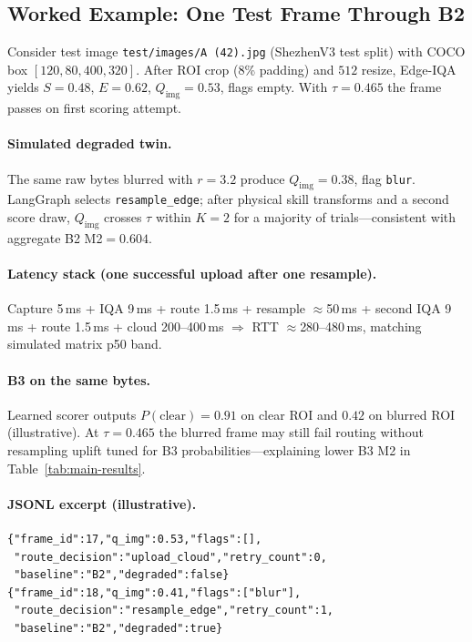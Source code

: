 \subsection{Worked Example: One Test Frame Through B2}
\label{sec:walkthrough}

Consider test image \texttt{test/images/A (42).jpg} (ShezhenV3 test split) with COCO box $[120, 80, 400, 320]$.
After ROI crop (8\% padding) and $512$ resize, Edge-IQA yields $S{=}0.48$, $E{=}0.62$, $Q_{\mathrm{img}}{=}0.53$, flags empty.
With $\tau{=}0.465$ the frame passes on first scoring attempt.

\paragraph{Simulated degraded twin.}
The same raw bytes blurred with $r{=}3.2$ produce $Q_{\mathrm{img}}{=}0.38$, flag \texttt{blur}.
LangGraph selects \texttt{resample\_edge}; after physical skill transforms and a second score draw, $Q_{\mathrm{img}}$ crosses $\tau$ within $K{=}2$ for a majority of trials---consistent with aggregate B2 M2$=0.604$.

\paragraph{Latency stack (one successful upload after one resample).}
Capture 5\,ms + IQA 9\,ms + route 1.5\,ms + resample $\approx$50\,ms + second IQA 9\,ms + route 1.5\,ms + cloud 200--400\,ms $\Rightarrow$ RTT $\approx$280--480\,ms, matching simulated matrix p50 band.

\paragraph{B3 on the same bytes.}
Learned scorer outputs $P(\mathrm{clear}){=}0.91$ on clear ROI and $0.42$ on blurred ROI (illustrative).
At $\tau{=}0.465$ the blurred frame may still fail routing without resampling uplift tuned for B3 probabilities---explaining lower B3 M2 in Table~\ref{tab:main-results}.

\paragraph{JSONL excerpt (illustrative).}
\begin{verbatim}
{"frame_id":17,"q_img":0.53,"flags":[],
 "route_decision":"upload_cloud","retry_count":0,
 "baseline":"B2","degraded":false}
{"frame_id":18,"q_img":0.41,"flags":["blur"],
 "route_decision":"resample_edge","retry_count":1,
 "baseline":"B2","degraded":true}
\end{verbatim}

